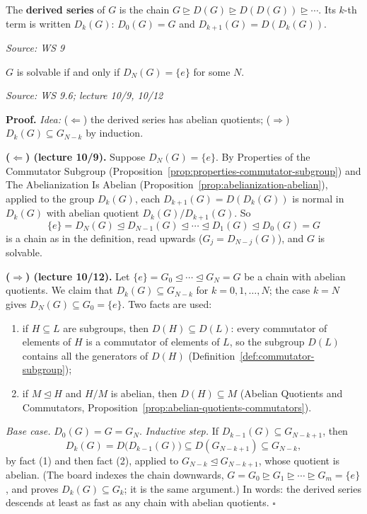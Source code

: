 \documentclass[11pt]{report}
\renewenvironment{proof}[1][Proof]{\noindent\textbf{#1.} }{\hfill$\square$\par\vspace{5pt}}
\newcommand{\srcline}[1]{\par\hfill{\footnotesize\textit{Source: #1}}}
\begin{document}
\begin{defbox}\label{def:derived-series}
The \textbf{derived series} of $G$ is the chain $G \trianglerighteq D(G) \trianglerighteq D(D(G)) \trianglerighteq \cdots$. Its $k$-th term is written $D_k(G)$: $D_0(G) = G$ and $D_{k+1}(G) = D(D_k(G))$.
\srcline{WS 9}
\end{defbox}

\begin{thmbox}\label{thm:solvable-derived-series}
$G$ is solvable if and only if $D_N(G) = \{e\}$ for some $N$.
\srcline{WS 9.6; lecture 10/9, 10/12}
\end{thmbox}

\begin{proof}
\textit{Idea:} ($\Leftarrow$) the derived series has abelian quotients; ($\Rightarrow$) $D_k(G) \subseteq G_{N-k}$ by induction.\par
\textbf{($\Leftarrow$) (lecture 10/9).} Suppose $D_N(G) = \{e\}$. By Properties of the Commutator Subgroup (Proposition~\ref{prop:properties-commutator-subgroup}) and The Abelianization Is Abelian (Proposition~\ref{prop:abelianization-abelian}), applied to the group $D_k(G)$, each $D_{k+1}(G) = D(D_k(G))$ is normal in $D_k(G)$ with abelian quotient $D_k(G)/D_{k+1}(G)$. So
\[ \{e\} = D_N(G) \trianglelefteq D_{N-1}(G) \trianglelefteq \cdots \trianglelefteq D_1(G) \trianglelefteq D_0(G) = G \]
is a chain as in the definition, read upwards ($G_j = D_{N-j}(G)$), and $G$ is solvable.

\textbf{($\Rightarrow$) (lecture 10/12).} Let $\{e\} = G_0 \trianglelefteq \cdots \trianglelefteq G_N = G$ be a chain with abelian quotients. We claim that $D_k(G) \subseteq G_{N-k}$ for $k = 0, 1, \ldots, N$; the case $k = N$ gives $D_N(G) \subseteq G_0 = \{e\}$. Two facts are used:
\begin{enumerate}[nosep]
    \item if $H \subseteq L$ are subgroups, then $D(H) \subseteq D(L)$: every commutator of elements of $H$ is a commutator of elements of $L$, so the subgroup $D(L)$ contains all the generators of $D(H)$ (Definition~\ref{def:commutator-subgroup});
    \item if $M \trianglelefteq H$ and $H/M$ is abelian, then $D(H) \subseteq M$ (Abelian Quotients and Commutators, Proposition~\ref{prop:abelian-quotients-commutators}).
\end{enumerate}
\emph{Base case.} $D_0(G) = G = G_N$. \emph{Inductive step.} If $D_{k-1}(G) \subseteq G_{N-k+1}$, then
\[ D_k(G) = D\big(D_{k-1}(G)\big) \subseteq D(G_{N-k+1}) \subseteq G_{N-k}, \]
by fact (1) and then fact (2), applied to $G_{N-k} \trianglelefteq G_{N-k+1}$, whose quotient is abelian. (The board indexes the chain downwards, $G = G_0 \trianglerighteq G_1 \trianglerighteq \cdots \trianglerighteq G_m = \{e\}$, and proves $D_k(G) \subseteq G_k$; it is the same argument.) In words: the derived series descends at least as fast as any chain with abelian quotients.
\end{proof}
\end{document}
